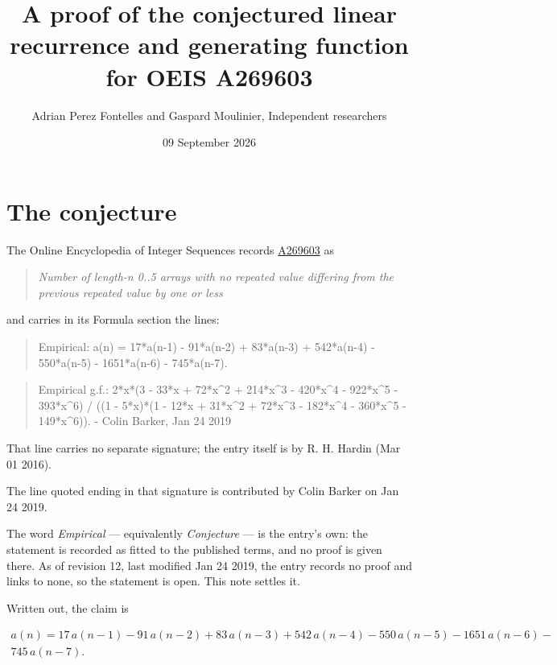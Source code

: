 \documentclass[11pt]{article}
\title{A proof of the conjectured linear recurrence and generating function for OEIS A269603}
\author{Adrian Perez Fontelles and Gaspard Moulinier, Independent researchers}
\date{09 September 2026}
\theoremstyle{definition}
\begin{document}
\maketitle
\section{The conjecture}

The Online Encyclopedia of Integer Sequences records \href{https://oeis.org/A269603}{A269603} as

\begin{quote}\itshape Number of length-n 0..5 arrays with no repeated value differing from the previous repeated value by one or less\end{quote}

and carries in its Formula section the lines:

\begin{quote}\ttfamily Empirical: a(n) = 17*a(n-1) - 91*a(n-2) + 83*a(n-3) + 542*a(n-4) - 550*a(n-5) - 1651*a(n-6) - 745*a(n-7).\end{quote}

\begin{quote}\ttfamily Empirical g.f.: 2*x*(3 - 33*x + 72*x\textasciicircum{}2 + 214*x\textasciicircum{}3 - 420*x\textasciicircum{}4 - 922*x\textasciicircum{}5 - 393*x\textasciicircum{}6) / ((1 - 5*x)*(1 - 12*x + 31*x\textasciicircum{}2 + 72*x\textasciicircum{}3 - 182*x\textasciicircum{}4 - 360*x\textasciicircum{}5 - 149*x\textasciicircum{}6)). - Colin Barker, Jan 24 2019\end{quote}

That line carries no separate signature; the entry itself is by R. H. Hardin (Mar 01 2016).

The line quoted ending in that signature is contributed by Colin Barker on Jan 24 2019.

The word {\itshape Empirical} --- equivalently {\itshape Conjecture} --- is the entry's own: the statement is recorded as fitted to the published terms, and no proof is given there. As of revision 12, last modified Jan 24 2019, the entry records no proof and links to none, so the statement is open. This note settles it.

Written out, the claim is

\begin{multline*} a(n) = 17\,a(n-1) - 91\,a(n-2) + 83\,a(n-3) + 542\,a(n-4) - 550\,a(n-5) - 1651\,a(n-6) - \\ 745\,a(n-7). \end{multline*}
\end{document}
